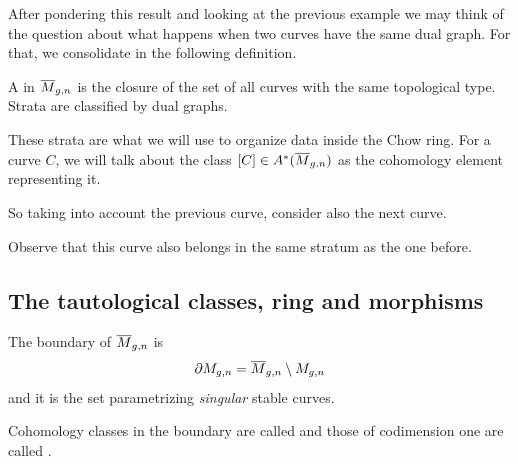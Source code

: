 \documentclass[12pt]{memoir}
\begin{document}
After pondering this result and looking at the previous example we may think of the question about what happens when two curves have the same dual graph. For that, we consolidate in the following definition.

\begin{Def}
    A  in $\overline{M}_{g,n}$ is the closure of the set of all curves with the same topological type. Strata are classified by dual graphs. 
\end{Def}

These strata are what we will use to organize data inside the Chow ring. For a curve $C$, we will talk about the class $[C]\in A^\ast(\overline M_{g,n})$ as the cohomology element representing it. 

\begin{Ex}
    So taking into account the previous curve, consider also the next curve. 

    Observe that this curve also belongs in the same stratum as the one before. 
\end{Ex}

\subsection{The tautological classes, ring and morphisms}

\begin{Def}
    The boundary of $\overline M_{g,n}$ is 
    $$\partial M_{g,n}=\overline M_{g,n}\setminus M_{g,n}$$
    and it is the set parametrizing \emph{singular} stable curves.\par
    Cohomology classes in the boundary are called  and those of codimension one are called .  
\end{Def}
\end{document}
